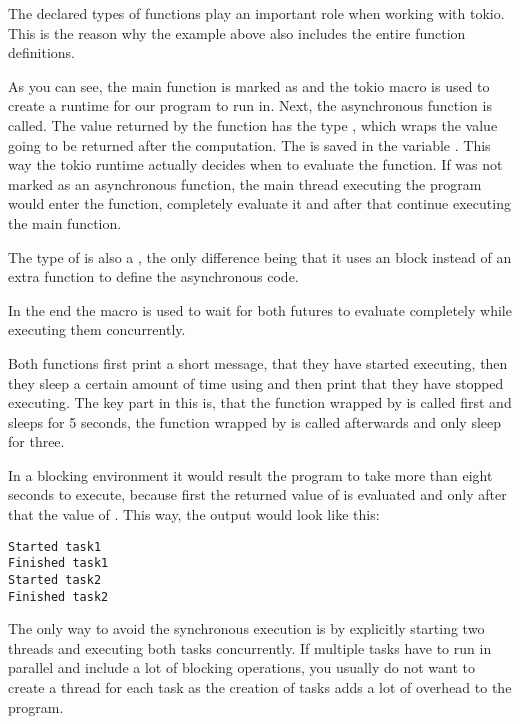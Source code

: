The declared types of functions play an important role when working with tokio. This is the reason why the example
above also includes the entire function definitions.

As you can see, the main function is marked as  and the tokio macro is used to create a runtime for our
program to run in. Next, the asynchronous function  is called. The value returned by the function
has the type , which wraps the value going to be returned after the computation. The
 is saved in the variable . This way the tokio runtime actually decides when to evaluate the
function. If  was not marked as an asynchronous function, the main thread executing the program
would enter the function, completely evaluate it and after that continue executing the main function.

The type of  is also a , the only difference being that it uses an  block
instead of an extra function to define the asynchronous code.

In the end the macro  is used to wait for both futures to evaluate completely while executing them
concurrently.

Both functions first print a short message, that they have started executing, then they sleep a certain amount of time
using  and then print that they have stopped executing. The key part in this is, that the
function wrapped by  is called first and sleeps for 5 seconds, the function wrapped by  is
called afterwards and only sleep for three.

In a blocking environment it would result the program to take more than eight seconds to execute, because first the
returned value of  is evaluated and only after that the value of . This way, the output
would look like this:

\begin{verbatim}
Started task1
Finished task1
Started task2
Finished task2
\end{verbatim}

The only way to avoid the synchronous execution is by explicitly starting two threads and executing both tasks
concurrently. If multiple tasks have to run in parallel and include a lot of blocking operations, you usually do not
want to create a thread for each task as the creation of tasks adds a lot of overhead to the program.

